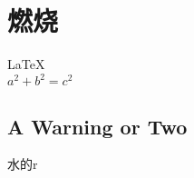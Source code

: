 \documentclass[UTF8]{article}
\begin{document}
       
 
\section{燃烧}          
\LaTeX \,\\ 
 $a^2+b^2=c^2$
 
\subsection{A Warning or Two}  

水的r
\end{document}
